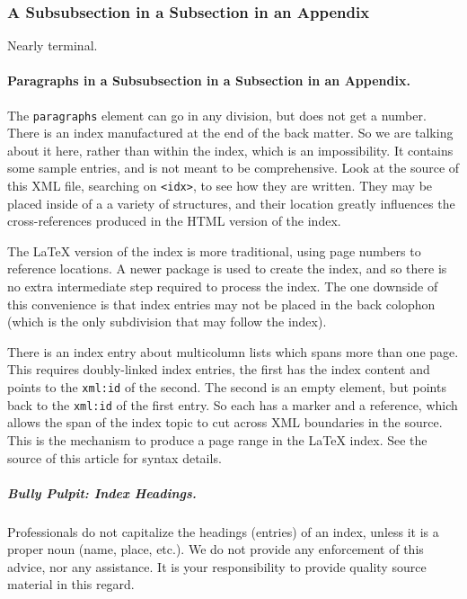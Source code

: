 \documentclass{sn-jnl}
\theoremstyle{thmstyleone}%
\theoremstyle{thmstyletwo}%
\theoremstyle{thmstylethree}%
\newcommand{\mono}[1]{\texttt{#1}}
\numberwithin{equation}{section}
\begin{document}
\begin{appendices}
\subsubsection{A Subsubsection in a Subsection in an Appendix}\label{appendix-structured-3-3}%
Nearly terminal.%
\paragraph*{Paragraphs in a Subsubsection in a Subsection in an Appendix.}\label{appendix-structured-3-3-3}%
The \mono{paragraphs} element can go in any division, but does not get a number.%
%
%
\typeout{************************************************}
\typeout{************************************************}
%
\label{appendix-index}%
There is an index manufactured at the end of the back matter.  So we are talking about it here, rather than within the index, which is an impossibility.  It contains some sample entries, and is not meant to be comprehensive.  Look at the source of this XML file, searching on \mono{<idx>}, to see how they are written.  They may be placed inside of a a variety of structures, and their location greatly influences the cross-references produced in the HTML version of the index.%
\par
The \LaTeX{} version of the index is more traditional, using page numbers to reference locations.  A newer package is used to create the index, and so there is no extra intermediate step required to process the index.  The one downside of this convenience is that index entries may not be placed in the back colophon (which is the only subdivision that may follow the index).%
\par
There is an index entry about multicolumn lists which spans more than one page.  This requires doubly-linked index entries, the first has the index content and points to the \mono{xml:id} of the second.  The second is an empty element, but points back to the \mono{xml:id} of the first entry.  So each has a marker and a reference, which allows the span of the index topic to cut across XML boundaries in the source.  This is the mechanism to produce a page range in the \LaTeX{} index.  See the source of this article for syntax details.%
\subparagraph*{Bully Pulpit: Index Headings.}\label{appendix-index-5}%
Professionals do not capitalize the headings (entries) of an index, unless it is a proper noun (name, place, etc.\@).  We do not provide any enforcement of this advice, nor any assistance.  It is your responsibility to provide quality source material in this regard.%

\end{appendices}
\end{document}
